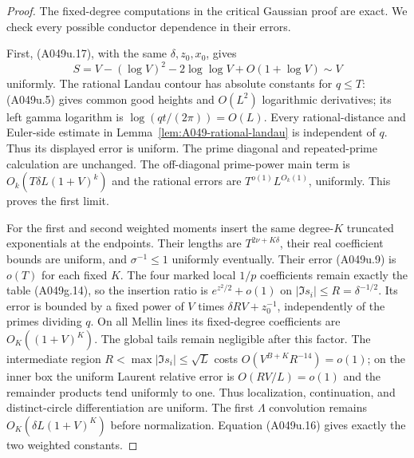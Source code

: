\begin{proof}
The fixed-degree computations in the critical Gaussian
proof are exact. We check every possible conductor
dependence in their errors.

First, (A049u.17), with the same $\delta,z_0,x_0$, gives
\[
 S=V-(\log V)^2-2\log\log V+O(1+\log V)\sim V
\tag{A049u.21}
\]
uniformly. The rational Landau contour has absolute
constants for $q\le T$: (A049u.5) gives common good heights
and $O(L^2)$ logarithmic derivatives; its left gamma
logarithm is $\log(qt/(2\pi))=O(L)$. Every rational-distance
and Euler-side estimate in Lemma~\ref{lem:A049-rational-landau}
is independent of $q$. Thus its displayed error is uniform.
The prime diagonal and repeated-prime calculation are
unchanged. The off-diagonal prime-power main term is
$O_k(T\delta L(1+V)^k)$ and the rational errors are
$T^{o(1)}L^{O_k(1)}$, uniformly. This proves the first limit.

For the first and second weighted moments insert the same
degree-$K$ truncated exponentials at the endpoints. Their
lengths are $T^{2\nu+K\delta}$, their real coefficient bounds
are uniform, and $\sigma^{-1}\le1$ uniformly eventually.
Their error (A049u.9) is $o(T)$ for each fixed $K$.
The four marked local $1/p$ coefficients remain exactly
the table (A049g.14), so the insertion ratio is
$e^{z^2/2}+o(1)$ on $|\Im s_i|\le R=\delta^{-1/2}$.
Its error is bounded by a fixed power of $V$ times
$\delta RV+z_0^{-1}$, independently of the primes dividing
$q$. On all Mellin lines its fixed-degree coefficients
are $O_K((1+V)^K)$. The global tails remain negligible
after this factor. The intermediate region
$R<\max|\Im s_i|\le\sqrt L$ costs
$O(V^{B+K}R^{-14})=o(1)$; on the inner box the uniform
Laurent relative error is $O(RV/L)=o(1)$ and the
remainder products tend uniformly to one. Thus localization,
continuation, and distinct-circle differentiation are
uniform. The first $\Lambda$ convolution remains
$O_K(\delta L(1+V)^K)$ before normalization.
Equation (A049u.16) gives exactly the two weighted constants.


\end{proof}

